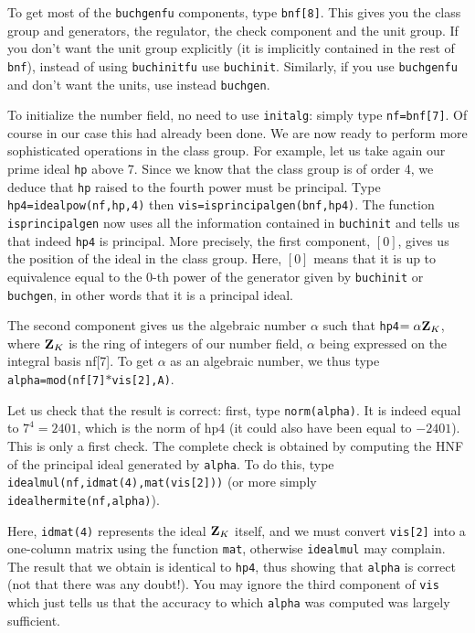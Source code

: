 To get most of the {\tt buchgenfu} components, type {\tt bnf[8]}. This gives
you the class group and generators, the regulator, the check component
and the unit group. If you don't want the unit group explicitly (it is 
implicitly contained in the rest of {\tt bnf}), instead of using
{\tt buchinitfu} use {\tt buchinit}. Similarly, if you use {\tt buchgenfu}
and don't want the units, use instead {\tt buchgen}.

To initialize the number field, no need to use {\tt initalg}: simply type
{\tt nf=bnf[7]}. Of course in our case this had already been done.
We are now ready to perform more sophisticated operations in the class group.
For example, let us take again our prime ideal {\tt hp} above 7. Since we
know that the class group is of order 4, we deduce that {\tt hp} raised to
the fourth power must be principal. Type {\tt hp4=idealpow(nf,hp,4)} then
{\tt vis=isprincipalgen(bnf,hp4)}. The function {\tt isprincipalgen} now uses
all the information contained in {\tt buchinit} and tells us that indeed 
{\tt hp4} is principal. More precisely, the first component, $[0]$, gives us 
the position of the ideal in the class group. Here, $[0]$ means that it is up
to equivalence equal to the 0-th power of the generator given by 
{\tt buchinit} or {\tt buchgen}, in other words that it is a principal ideal.

The second component gives us the algebraic number $\alpha$ such that
{\tt hp4$=\alpha{\bf Z}_K$}, where ${\bf Z}_K$ is the ring of integers of our number
field, $\alpha$ being expressed on the integral basis nf[7]. To get $\alpha$
as an algebraic number, we thus type {\tt alpha=mod(nf[7]$*$vis[2],A)}.

Let us check that the result is correct: first, type {\tt norm(alpha)}.
It is indeed equal to $7^4=2401$, which is the norm of hp4 (it could also
have been equal to $-2401$). This is only a first check. The complete check
is obtained by computing the HNF of the principal ideal generated by 
{\tt alpha}. To do this, type {\tt idealmul(nf,idmat(4),mat(vis[2]))}
(or more simply {\tt idealhermite(nf,alpha)}).

Here, {\tt idmat(4)} represents the ideal ${\bf Z}_K$ itself, and we must convert
{\tt vis[2]} into a one-column matrix using the function {\tt mat}, otherwise
{\tt idealmul} may complain. The result that we obtain is identical to
{\tt hp4}, thus showing that {\tt alpha} is correct (not that there was any
doubt!). You may ignore the third component of {\tt vis} which just tells us
that the accuracy to which {\tt alpha} was computed was largely sufficient.

